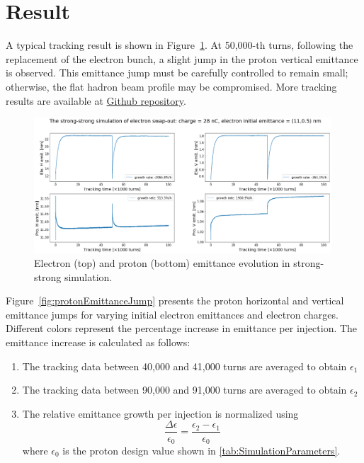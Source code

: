 \documentclass{article}
\begin{document}
\section{Result}
A typical tracking result is shown in Figure~\ref{fig:ssTrackingExample}.
At 50,000-th turns, following the replacement of the electron bunch, a slight jump 
in the proton vertical emittance is observed. This emittance jump must be 
carefully controlled to remain small; otherwise, the flat hadron beam profile 
may be compromised.
More tracking results are available at \href{https://github.com/xud929/ESR_injection_swapOut/tree/main/pic}{Github repository}.
\begin{figure}
    \centering
    \includegraphics[width=0.99\textwidth]{pic/28nC_track/11_0.5.png}
    \caption{Electron (top) and proton (bottom) emittance evolution in strong-strong simulation.}
    \label{fig:ssTrackingExample}
\end{figure}

Figure~\ref{fig:protonEmittanceJump} presents the proton horizontal and vertical 
emittance jumps for varying initial electron emittances and electron charges. 
Different colors represent the percentage increase in emittance per injection.
The emittance increase is calculated as follows:
\begin{enumerate}[(1)]
    \item The tracking data between 40,000 and 41,000 turns are averaged to obtain $\epsilon_1$
    \item The tracking data between 90,000 and 91,000 turns are averaged to obtain $\epsilon_2$
    \item The relative emittance growth per injection is normalized using
    \begin{displaymath}
    \frac{\Delta \epsilon}{\epsilon_0}=\frac{\epsilon_2-\epsilon_1}{\epsilon_0}
    \end{displaymath}
    where $\epsilon_0$ is the proton design value shown in \ref{tab:SimulationParameters}.
\end{enumerate}
\end{document}
